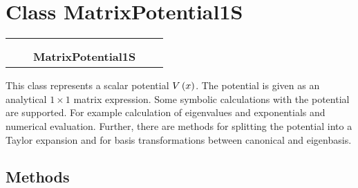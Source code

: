 
\section{Class MatrixPotential1S}

    \label{MatrixPotential1S:MatrixPotential1S}
\begin{tabular}{cccccc}
\multicolumn{2}{r}{\settowidth{\BCL}{MatrixPotential}\multirow{2}{\BCL}{MatrixPotential}}
&&
  \\\cline{3-3}
  &&\multicolumn{1}{c|}{}
&&
  \\
&&\multicolumn{2}{l}{\textbf{MatrixPotential1S}}
\end{tabular}

This class represents a scalar potential $V\left( x \right)$. The
potential is given as an analytical $1 \times 1$ matrix expression.
Some symbolic calculations with the potential are supported. For example
calculation of eigenvalues and exponentials and numerical evaluation.
Further, there are methods for splitting the potential into a Taylor
expansion and for basis transformations between canonical and eigenbasis.



  \subsection{Methods}

    \vspace{0.5ex}

